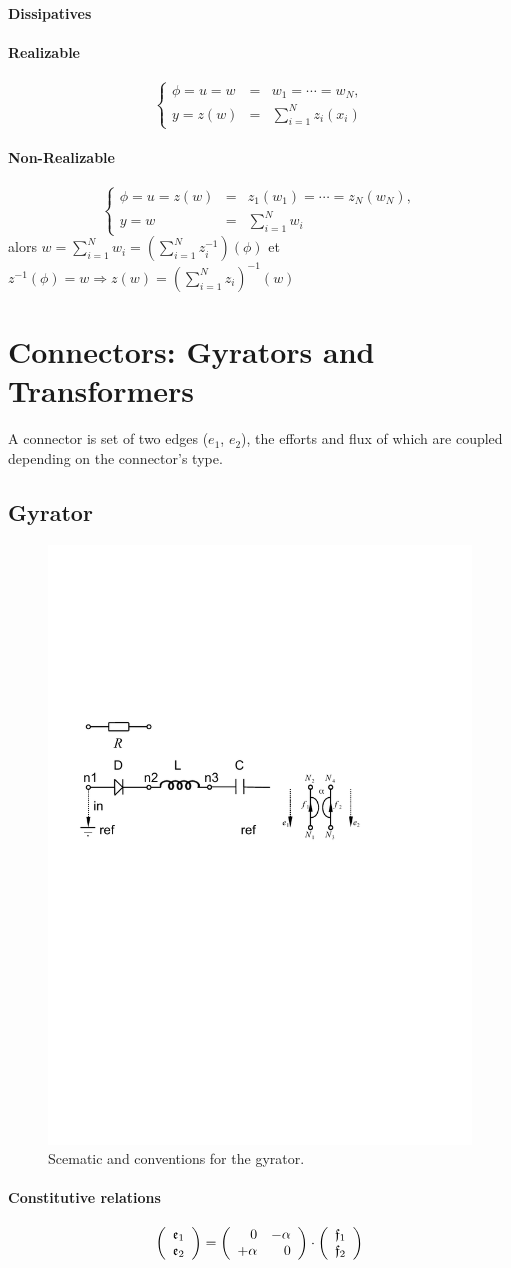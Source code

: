 \documentclass[10pt,a4paper]{article}
\begin{document}
\textbf{Dissipatives}
\paragraph{Realizable} 
$$\left\{ \begin{array}{rcl}
\phi = u =w &=& w_1 =\cdots = w_N ,\\
y =z(w)&= &\sum_{i=1}^N z_i(x_i) 
\end{array}\right.$$
\paragraph{Non-Realizable}
$$\left\{ \begin{array}{rcl}
\phi = u =z(w) &=& z_1(w_1) =\cdots = z_N(w_N) ,\\
y = w &=& \sum_{i=1}^Nw_i\end{array}\right.$$
alors $ w =\sum_{i=1}^N w_i=\left(\sum_{i=1}^N z^{-1}_i\right)(\phi) $ et $z^{-1}(\phi) = w\Rightarrow z(w) =  \left(\sum_{i=1}^N z_i\right)^{-1}(w)$


\section{Connectors: Gyrators and Transformers}
A connector is set of two edges ($e_1$, $e_2$), the efforts and flux of which are coupled depending on the connector's type.
\subsection{Gyrator}
%
\begin{figure}
\centering
\includegraphics[width=0.3\linewidth]{figures/gyrator_scematic.pdf} 
\caption{Scematic and conventions for the gyrator.}
\end{figure}
%
\paragraph{Constitutive relations}
$$
\left(
\begin{array}{c}
\mathfrak{e}_1\\
\mathfrak{e}_2
\end{array}
\right)
=
\left(
\begin{array}{rr}
0 & -\alpha \\
+ \alpha  & 0
\end{array}
\right)
\cdot
\left(
\begin{array}{c}
\mathfrak{f}_1\\
\mathfrak{f}_2
\end{array}
\right)
$$
\end{document}
